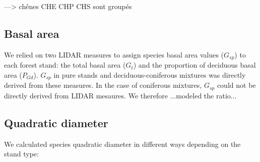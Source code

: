 \documentclass[a4paper]{article}
\begin{document}
---> chênes CHE CHP CHS sont groupés


\subsection*{Basal area}

\noindent We relied on two LIDAR measures to assign species basal area values ($G_{sp}$) to each forest stand: the total basal area ($G_t$) and the proportion of deciduous basal area ($P_{Gd}$). $G_{sp}$ in pure stands and deciduous-coniferous mixtures was directly derived from these measures. In the case of coniferous mixtures, $G_{sp}$ could not be directly derived from LIDAR mesaures. We therefore ...modeled the ratio...


\subsection*{Quadratic diameter}

We calculated species quadratic diameter in different ways depending on the stand type:
\end{document}
